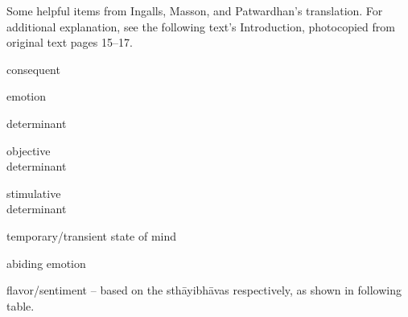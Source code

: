 \documentclass{article}
\begin{document}
Some helpful items from Ingalls, Masson, and Patwardhan's translation. For additional explanation, see the following text's Introduction, photocopied from original text pages 15--17.
\vspace{-6pt}
\begin{multicols}{2}
\begin{description}
	\setlength{\itemsep}{-0.2em}

	\item[anubhāva] consequent
	\item[bhāva] emotion
	\item[vibhāva] determinant

	      \vspace{-6pt}
	      \begin{description}[
			itemindent=-3em
		]
		      \setlength{\itemsep}{-0.2em}
		      \item[ālambanavibhāva] objective \\ determinant
		      \item[uddīpanavibhāva] stimulative \\ determinant
	      \end{description}

	      \vspace{-4pt}
	\item[vyabhicārin/vyabhicāribhāva] temporary/transient state of mind

	\item[sthāyibhāva] abiding emotion

	\item[rasa] flavor/sentiment -- based on the sthāyibhāvas respectively, as shown in following table.

\end{description}
\end{multicols}
\end{document}

